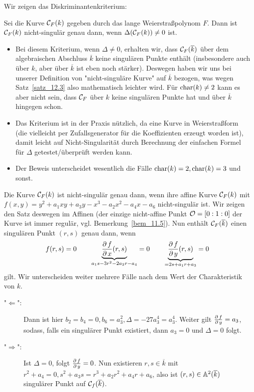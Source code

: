 Wir zeigen das Diskriminantenkriterium:
\begin{satz}[Diskriminantenkriterium]
\label{satz_12.3}
	Sei die Kurve $\mathcal{C}_F(k)$ gegeben durch das lange Weierstraßpolynom $F$. 
	Dann ist $\mathcal{C}_F(k)$ nicht-singulär genau dann, wenn $\Delta(\mathcal{C}_F(k)) \neq 0$ ist.
\end{satz}

\begin{bem}
	\begin{itemize}
		\item Bei diesem Kriterium, wenn $\Delta \neq 0$, erhalten wir, dass $\mathcal{C}_F(\overline{k})$ über dem algebraischen Abschluss $\overline{k}$ keine singulären Punkte enthält (insbesondere auch über $k$, aber über $\overline{k}$ ist eben noch stärker). 
		Deswegen haben wir uns bei unserer Definition von "nicht-singuläre Kurve" auf $\overline{k}$ bezogen, was wegen Satz~\ref{satz_12.3} also mathematisch leichter wird. 
		Für $\operatorname{char}(k) \neq 2$ kann es aber nicht sein, dass $\mathcal{C}_F$ über $k$ keine singulären Punkte hat und über $\overline{k}$ hingegen schon.
		\item Das Kriterium ist in der Praxis nützlich, da eine Kurve in Weierstraßform (die vielleicht per Zufallsgenerator für die Koeffizienten erzeugt worden ist), damit leicht auf Nicht-Singularität durch Berechnung der einfachen Formel für $\Delta$ getestet/überprüft werden kann.
		\item Der Beweis unterscheidet wesentlich die Fälle $\operatorname{char}(k) = 2, \operatorname{char}(k) = 3$ und sonst.
	\end{itemize}
\end{bem}

\begin{bew}
	Die Kurve $\mathcal{C}_F(k)$ ist nicht-singulär genau dann, wenn ihre affine Kurve $\mathcal{C}_F(k)$ mit $f(x,y) = y^2 + a_1xy + a_3y - x^3 - a_2x^2 - a_4 x - a_6$ nicht-singulär ist. 
	Wir zeigen den Satz deswegen im Affinen (der einzige nicht-affine Punkt $\mathcal{O} = [0:1:0]$ der Kurve ist immer regulär, vgl. Bemerkung~\ref{bem_11.5}). 
	Nun enthält $\mathcal{C}_F(\overline{k})$ einen singulären Punkt $(r,s)$ genau dann, wenn
	\[ f(r,s) = 0 \qquad \underbrace{\frac{\operatorname{\partial} f}{\operatorname{\partial} x} (r,s)}_{a_1 s - 3r^2 - 2a_2r - a_4} = 0 \qquad \underbrace{\frac{\operatorname{\partial} f}{\operatorname{\partial} y} (r,s)}_{=2s + a_1 r + a_3} = 0 \]
	gilt. 
	Wir unterscheiden weiter mehrere Fälle nach dem Wert der Charakteristik von $k$.
\end{bew}

\begin{bew}[1. Fall: $\Char(k)= 2$ und $a_1 = 0$]
	\begin{description}
		\item["$\Leftarrow$":] Dann ist hier $b_2 = b_4 = 0, b_6 = a_3^2, \Delta = -27a_3^4 = a_3^4$. 
		Weiter gilt $\frac{\operatorname{\partial} f}{\operatorname{\partial} y} = a_3$, sodass, falls ein singulärer Punkt existiert, dann $a_3 = 0$ und $\Delta = 0$ folgt.
		\item["$\Rightarrow$":] Ist $\Delta = 0$, folgt $\frac{\operatorname{\partial} f}{\operatorname{\partial} y} = 0$. 
		Nun existieren $r,s \in \overline{k}$ mit $r^2 + a_4=0, s^2 + a_3s = r^3 + a_2r^2 + a_4r + a_6$, also ist $(r,s) \in \mathbb{A}^2(\overline{k})$ singulärer Punkt auf $\mathcal{C}_f(\overline{k})$.
	\end{description}
\end{bew}

